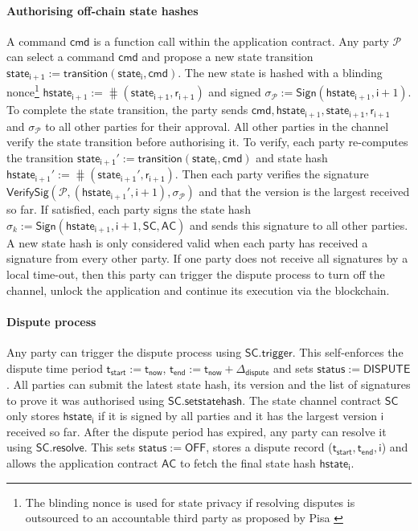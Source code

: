 \documentclass{llncs}
\newcommand{\chanstatus}{\mathsf{status}}
\newcommand{\chandispute}{\mathsf{DISPUTE}}
\newcommand{\chanoff}{\mathsf{OFF}}
\newcommand{\cmd}{\mathsf{cmd}}
\newcommand{\hstatei}{\mathsf{hstate}_{\monotoniccounter}}
\newcommand{\hstateplus}{\ensuremath{\mathsf{hstate}_{\monotoniccounter+1}}}
\newcommand{\monotoniccounter}{\mathsf{i}}
\newcommand{\stateinfoi}{\mathsf{state}_{\mathsf{i}}}
\newcommand{\stateinfoplus}{\mathsf{state}_{\mathsf{i+1}}}
\newcommand{\participant}{\mathcal{P}}
\newcommand{\ranplus}{\mathsf{r}_{\mathsf{i+1}}}
\newcommand{\statechannel}{\mathsf{SC}}
\newcommand{\statechanneldispute}{\mathsf{SC}.\mathsf{trigger}}
\newcommand{\statechannelsetstate}{\mathsf{SC}.\mathsf{setstatehash}}
\newcommand{\statechannelresolve}{\mathsf{SC}.\mathsf{resolve}}
\newcommand{\sign}{\mathsf{Sign}}
\newcommand{\verifysig}{\mathsf{VerifySig}}
\newcommand{\appcontract}{\mathsf{AC}}
\newcommand{\timenow}{\mathsf{t}_{\mathsf{now}}}
\newcommand{\timestart}{\mathsf{t}_{\mathsf{start}}}
\newcommand{\timeend}{\mathsf{t}_{\mathsf{end}}}
\newcommand{\timedispute}{\timenow + \mathsf{\Delta}_{\mathsf{dispute}}}
\begin{document}
\paragraph{Authorising off-chain state hashes}
A command $\cmd$ is a function call within the application contract.
Any party $\participant$ can select a command $\cmd$ and propose a new state transition $\stateinfoplus := \mathsf{transition}(\stateinfoi, \cmd)$.
The new state is hashed  with a blinding nonce\footnote{The blinding nonce is used for state privacy if resolving disputes is outsourced to an accountable third party as proposed by Pisa \cite{mccorry2018pisa}}  $\hstateplus := \hash(\stateinfoplus, \ranplus)$ and signed  $\sigma_{\participant} := \sign(\hstateplus,\monotoniccounter+1)$.
To complete the state transition, the party sends $\cmd,\hstateplus, \stateinfoplus, \ranplus$ and $\sigma_{\participant}$ to all other parties for their approval.
All other parties in the channel verify the state transition before authorising it. 
To verify, each party re-computes the transition $\stateinfoplus' := \mathsf{transition}(\stateinfoi, \cmd)$ and state hash $\hstateplus' := \hash(\stateinfoplus', \ranplus)$.
Then each party verifies the signature $\verifysig(\participant, (\hstateplus', \monotoniccounter+1), \sigma_{\participant})$ and that the version is the largest received so far. 
If satisfied, each party signs the state hash  $\sigma_{k} := \sign(\hstateplus,\monotoniccounter+1, \statechannel, \appcontract)$ and sends this signature to all other parties. 
A new state hash is only considered valid when each party has received a signature from every other party.  
If one party does not receive all signatures by a local time-out, then this party can trigger the dispute process to turn off the channel, unlock the application and continue its execution via the blockchain. 

\paragraph{Dispute process} 

Any party can trigger the dispute process using $\statechanneldispute$.
This self-enforces the dispute time period $\timestart := \timenow$, $\timeend := \timedispute$ and sets $\chanstatus := \chandispute$. 
All parties can submit the latest state hash, its version and the list of signatures to prove it was authorised using $\statechannelsetstate$. 
The state channel contract $\statechannel$ only stores $\hstatei$ if it is signed by all parties and it has the largest version $\monotoniccounter$ received so far. 
After the dispute period has expired, any party can resolve it using $\statechannelresolve$.
This sets $\chanstatus := \chanoff$, stores a dispute record ($\timestart,\timeend, \monotoniccounter$) and allows the application contract $\appcontract$ to fetch the final state hash $\hstatei$. 
\end{document}
